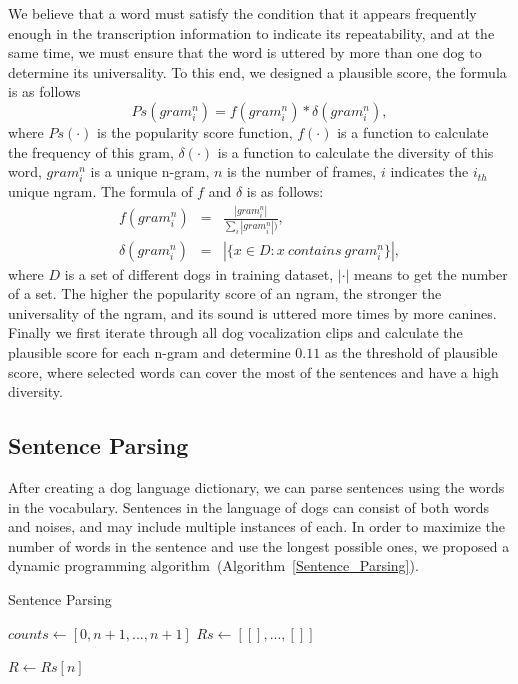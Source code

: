 We believe that a word must satisfy the condition that it appears frequently enough in the transcription information to indicate its repeatability, and at the same time, we must ensure that the word is uttered by more than one dog to determine its universality. To this end, we designed a plausible score, the formula is as follows
$$Ps(gram^n_i) = f(gram^n_i) * \delta(gram^n_i),$$
where $Ps(\cdot)$ is the popularity score function, $f(\cdot)$ is a function to calculate the frequency of this gram, $\delta(\cdot)$ is a function to calculate the diversity of this word, $gram^n_i$ is a unique n-gram, $n$ is the number of frames, $i$ indicates the $i_{th}$ unique ngram. The formula of $f$ and $\delta$ is as follows: 
\begin{eqnarray*}
f(gram^n_i) &=& \frac{\left | gram^n_i\right |}{\sum_{i}\left |gram^n_i\right |)},\\
\delta(gram^n_i) &=& \left |\{x\in D:x\ contains\ gram^n_i\}\right|,
\end{eqnarray*}
where $D$ is a set of different dogs in training dataset, $\left |\cdot \right |$ means to get the number of a set. 
The higher the popularity score of an ngram, the stronger the universality of the ngram, and its sound is uttered more times by more canines. Finally we first iterate through all dog vocalization clips and calculate the plausible score for each n-gram and determine $0.11$ as the threshold of plausible score, where selected words can cover the most of the sentences and have a high diversity.

\subsection{Sentence Parsing}

After creating a dog language dictionary, we can parse sentences using the words in the vocabulary. 
Sentences in the language of dogs can consist of both words and noises, and may include multiple instances of each. 
In order to maximize the number of words in the sentence and use the longest possible ones, we proposed a dynamic programming algorithm~(Algorithm~\ref{Sentence_Parsing}).
\begin{algorithm}
\small
	\caption{Sentence Parsing}\label{Sentence_Parsing}
	
	
	\BlankLine
	
	$counts \leftarrow [0, n+1, ..., n+1]$\;
	$Rs \leftarrow [[ ], ...,[ ]]$\;
	
	$R \leftarrow Rs[n]$\;
\end{algorithm}

